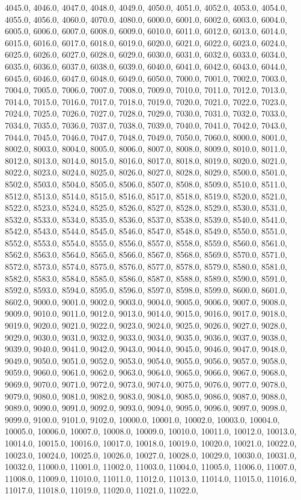 4045.0, 4046.0, 4047.0, 4048.0, 4049.0, 4050.0, 4051.0, 4052.0, 4053.0, 4054.0, 4055.0, 4056.0, 4060.0, 4070.0, 4080.0, 6000.0, 6001.0, 6002.0, 6003.0, 6004.0, 6005.0, 6006.0, 6007.0, 6008.0, 6009.0, 6010.0, 6011.0, 6012.0, 6013.0, 6014.0, 6015.0, 6016.0, 6017.0, 6018.0, 6019.0, 6020.0, 6021.0, 6022.0, 6023.0, 6024.0, 6025.0, 6026.0, 6027.0, 6028.0, 6029.0, 6030.0, 6031.0, 6032.0, 6033.0, 6034.0, 6035.0, 6036.0, 6037.0, 6038.0, 6039.0, 6040.0, 6041.0, 6042.0, 6043.0, 6044.0, 6045.0, 6046.0, 6047.0, 6048.0, 6049.0, 6050.0, 7000.0, 7001.0, 7002.0, 7003.0, 7004.0, 7005.0, 7006.0, 7007.0, 7008.0, 7009.0, 7010.0, 7011.0, 7012.0, 7013.0, 7014.0, 7015.0, 7016.0, 7017.0, 7018.0, 7019.0, 7020.0, 7021.0, 7022.0, 7023.0, 7024.0, 7025.0, 7026.0, 7027.0, 7028.0, 7029.0, 7030.0, 7031.0, 7032.0, 7033.0, 7034.0, 7035.0, 7036.0, 7037.0, 7038.0, 7039.0, 7040.0, 7041.0, 7042.0, 7043.0, 7044.0, 7045.0, 7046.0, 7047.0, 7048.0, 7049.0, 7050.0, 7060.0, 8000.0, 8001.0, 8002.0, 8003.0, 8004.0, 8005.0, 8006.0, 8007.0, 8008.0, 8009.0, 8010.0, 8011.0, 8012.0, 8013.0, 8014.0, 8015.0, 8016.0, 8017.0, 8018.0, 8019.0, 8020.0, 8021.0, 8022.0, 8023.0, 8024.0, 8025.0, 8026.0, 8027.0, 8028.0, 8029.0, 8500.0, 8501.0, 8502.0, 8503.0, 8504.0, 8505.0, 8506.0, 8507.0, 8508.0, 8509.0, 8510.0, 8511.0, 8512.0, 8513.0, 8514.0, 8515.0, 8516.0, 8517.0, 8518.0, 8519.0, 8520.0, 8521.0, 8522.0, 8523.0, 8524.0, 8525.0, 8526.0, 8527.0, 8528.0, 8529.0, 8530.0, 8531.0, 8532.0, 8533.0, 8534.0, 8535.0, 8536.0, 8537.0, 8538.0, 8539.0, 8540.0, 8541.0, 8542.0, 8543.0, 8544.0, 8545.0, 8546.0, 8547.0, 8548.0, 8549.0, 8550.0, 8551.0, 8552.0, 8553.0, 8554.0, 8555.0, 8556.0, 8557.0, 8558.0, 8559.0, 8560.0, 8561.0, 8562.0, 8563.0, 8564.0, 8565.0, 8566.0, 8567.0, 8568.0, 8569.0, 8570.0, 8571.0, 8572.0, 8573.0, 8574.0, 8575.0, 8576.0, 8577.0, 8578.0, 8579.0, 8580.0, 8581.0, 8582.0, 8583.0, 8584.0, 8585.0, 8586.0, 8587.0, 8588.0, 8589.0, 8590.0, 8591.0, 8592.0, 8593.0, 8594.0, 8595.0, 8596.0, 8597.0, 8598.0, 8599.0, 8600.0, 8601.0, 8602.0, 9000.0, 9001.0, 9002.0, 9003.0, 9004.0, 9005.0, 9006.0, 9007.0, 9008.0, 9009.0, 9010.0, 9011.0, 9012.0, 9013.0, 9014.0, 9015.0, 9016.0, 9017.0, 9018.0, 9019.0, 9020.0, 9021.0, 9022.0, 9023.0, 9024.0, 9025.0, 9026.0, 9027.0, 9028.0, 9029.0, 9030.0, 9031.0, 9032.0, 9033.0, 9034.0, 9035.0, 9036.0, 9037.0, 9038.0, 9039.0, 9040.0, 9041.0, 9042.0, 9043.0, 9044.0, 9045.0, 9046.0, 9047.0, 9048.0, 9049.0, 9050.0, 9051.0, 9052.0, 9053.0, 9054.0, 9055.0, 9056.0, 9057.0, 9058.0, 9059.0, 9060.0, 9061.0, 9062.0, 9063.0, 9064.0, 9065.0, 9066.0, 9067.0, 9068.0, 9069.0, 9070.0, 9071.0, 9072.0, 9073.0, 9074.0, 9075.0, 9076.0, 9077.0, 9078.0, 9079.0, 9080.0, 9081.0, 9082.0, 9083.0, 9084.0, 9085.0, 9086.0, 9087.0, 9088.0, 9089.0, 9090.0, 9091.0, 9092.0, 9093.0, 9094.0, 9095.0, 9096.0, 9097.0, 9098.0, 9099.0, 9100.0, 9101.0, 9102.0, 10000.0, 10001.0, 10002.0, 10003.0, 10004.0, 10005.0, 10006.0, 10007.0, 10008.0, 10009.0, 10010.0, 10011.0, 10012.0, 10013.0, 10014.0, 10015.0, 10016.0, 10017.0, 10018.0, 10019.0, 10020.0, 10021.0, 10022.0, 10023.0, 10024.0, 10025.0, 10026.0, 10027.0, 10028.0, 10029.0, 10030.0, 10031.0, 10032.0, 11000.0, 11001.0, 11002.0, 11003.0, 11004.0, 11005.0, 11006.0, 11007.0, 11008.0, 11009.0, 11010.0, 11011.0, 11012.0, 11013.0, 11014.0, 11015.0, 11016.0, 11017.0, 11018.0, 11019.0, 11020.0, 11021.0, 11022.0, 
